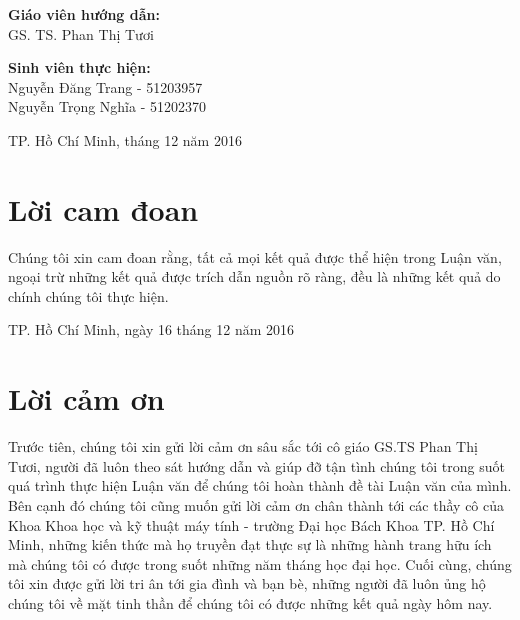 \documentclass[12pt]{report}
\begin{document}
\begin{titlepage}
\begin{flushright}
\begin{minipage}{0.7\textwidth}

\end{minipage}
\end{flushright}

\begin{flushleft} \large
\textbf{Giáo viên hướng dẫn:}\\
GS. TS. Phan Thị Tươi\\[2.0cm]
\end{flushleft}

\begin{flushleft} \large
\textbf{Sinh viên thực hiện:}\\
Nguyễn Đăng Trang - 51203957\\
Nguyễn Trọng Nghĩa - 51202370\\[2cm]
\end{flushleft}

\begin{flushleft} \large
\centering
TP. Hồ Chí Minh, tháng 12 năm 2016
\end{flushleft}

\vfill %

\end{titlepage}

\newpage
	\chapter*{Lời cam đoan}
		\par Chúng tôi xin cam đoan rằng, tất cả mọi kết quả được thể hiện trong Luận văn, ngoại trừ những kết quả được trích dẫn nguồn rõ ràng, đều là những kết quả do chính chúng tôi thực hiện.

		\begin{flushright}
			TP. Hồ Chí Minh, ngày 16 tháng 12 năm 2016
		\end{flushright}

\newpage
	\chapter*{Lời cảm ơn}
		\par Trước tiên, chúng tôi xin gửi lời cảm ơn sâu sắc tới cô giáo GS.TS Phan Thị Tươi, người đã luôn theo sát hướng dẫn và giúp đỡ tận tình chúng tôi trong suốt quá trình thực hiện Luận văn để chúng tôi hoàn thành đề tài Luận văn của mình. Bên cạnh đó chúng tôi cũng muốn gửi lời cảm ơn chân thành tới các thầy cô của Khoa Khoa học và kỹ thuật máy tính - trường Đại học Bách Khoa TP. Hồ Chí Minh, những kiến thức mà họ truyền đạt thực sự là những hành trang hữu ích mà chúng tôi có được trong suốt những năm tháng học đại học. Cuối cùng, chúng tôi xin được gửi lời tri ân tới gia đình và bạn bè, những người đã luôn ủng hộ chúng tôi về mặt tinh thần để chúng tôi có được những kết quả ngày hôm nay. 
\end{document}
